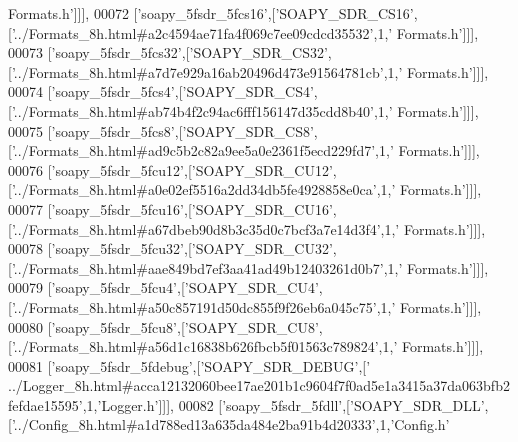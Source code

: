\begin{DoxyCode}
{      Formats.h'}]]],
00072   [\textcolor{stringliteral}{'soapy\_5fsdr\_5fcs16'},[\textcolor{stringliteral}{'SOAPY\_SDR\_CS16'},[\textcolor{stringliteral}{'../Formats\_8h.html#a2c4594ae71fa4f069c7ee09cdcd35532'},1,\textcolor{stringliteral}{'
      Formats.h'}]]],
00073   [\textcolor{stringliteral}{'soapy\_5fsdr\_5fcs32'},[\textcolor{stringliteral}{'SOAPY\_SDR\_CS32'},[\textcolor{stringliteral}{'../Formats\_8h.html#a7d7e929a16ab20496d473e91564781cb'},1,\textcolor{stringliteral}{'
      Formats.h'}]]],
00074   [\textcolor{stringliteral}{'soapy\_5fsdr\_5fcs4'},[\textcolor{stringliteral}{'SOAPY\_SDR\_CS4'},[\textcolor{stringliteral}{'../Formats\_8h.html#ab74b4f2c94ac6fff156147d35cdd8b40'},1,\textcolor{stringliteral}{'
      Formats.h'}]]],
00075   [\textcolor{stringliteral}{'soapy\_5fsdr\_5fcs8'},[\textcolor{stringliteral}{'SOAPY\_SDR\_CS8'},[\textcolor{stringliteral}{'../Formats\_8h.html#ad9c5b2c82a9ee5a0e2361f5ecd229fd7'},1,\textcolor{stringliteral}{'
      Formats.h'}]]],
00076   [\textcolor{stringliteral}{'soapy\_5fsdr\_5fcu12'},[\textcolor{stringliteral}{'SOAPY\_SDR\_CU12'},[\textcolor{stringliteral}{'../Formats\_8h.html#a0e02ef5516a2dd34db5fe4928858e0ca'},1,\textcolor{stringliteral}{'
      Formats.h'}]]],
00077   [\textcolor{stringliteral}{'soapy\_5fsdr\_5fcu16'},[\textcolor{stringliteral}{'SOAPY\_SDR\_CU16'},[\textcolor{stringliteral}{'../Formats\_8h.html#a67dbeb90d8b3c35d0c7bcf3a7e14d3f4'},1,\textcolor{stringliteral}{'
      Formats.h'}]]],
00078   [\textcolor{stringliteral}{'soapy\_5fsdr\_5fcu32'},[\textcolor{stringliteral}{'SOAPY\_SDR\_CU32'},[\textcolor{stringliteral}{'../Formats\_8h.html#aae849bd7ef3aa41ad49b12403261d0b7'},1,\textcolor{stringliteral}{'
      Formats.h'}]]],
00079   [\textcolor{stringliteral}{'soapy\_5fsdr\_5fcu4'},[\textcolor{stringliteral}{'SOAPY\_SDR\_CU4'},[\textcolor{stringliteral}{'../Formats\_8h.html#a50c857191d50dc855f9f26eb6a045c75'},1,\textcolor{stringliteral}{'
      Formats.h'}]]],
00080   [\textcolor{stringliteral}{'soapy\_5fsdr\_5fcu8'},[\textcolor{stringliteral}{'SOAPY\_SDR\_CU8'},[\textcolor{stringliteral}{'../Formats\_8h.html#a56d1c16838b626fbcb5f01563c789824'},1,\textcolor{stringliteral}{'
      Formats.h'}]]],
00081   [\textcolor{stringliteral}{'soapy\_5fsdr\_5fdebug'},[\textcolor{stringliteral}{'SOAPY\_SDR\_DEBUG'},[\textcolor{stringliteral}{'
      ../Logger\_8h.html#acca12132060bee17ae201b1c9604f7f0ad5e1a3415a37da063bfb2fefdae15595'},1,\textcolor{stringliteral}{'Logger.h'}]]],
00082   [\textcolor{stringliteral}{'soapy\_5fsdr\_5fdll'},[\textcolor{stringliteral}{'SOAPY\_SDR\_DLL'},[\textcolor{stringliteral}{'../Config\_8h.html#a1d788ed13a635da484e2ba91b4d20333'},1,\textcolor{stringliteral}{'Config.h'}

\end{DoxyCode}
